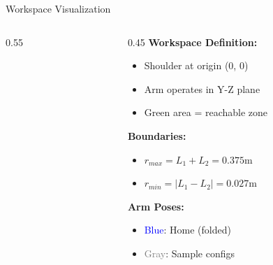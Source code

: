 \begin{frame}{Workspace Visualization}
\begin{columns}
\begin{column}{0.55\textwidth}
\end{column}
\begin{column}{0.45\textwidth}
    \textbf{Workspace Definition:}
    \begin{itemize}
        \item Shoulder at origin (0, 0)
        \item Arm operates in Y-Z plane
        \item Green area = reachable zone
    \end{itemize}

    \vspace{0.3cm}

    \textbf{Boundaries:}
    \begin{itemize}
        \item $r_{max} = L_1 + L_2 = 0.375$m
        \item $r_{min} = |L_1 - L_2| = 0.027$m
    \end{itemize}

    \vspace{0.3cm}

    \textbf{Arm Poses:}
    \begin{itemize}
        \item \textcolor{blue}{Blue}: Home (folded)
        \item \textcolor{gray}{Gray}: Sample configs
    \end{itemize}
\end{column}
\end{columns}
\end{frame}

